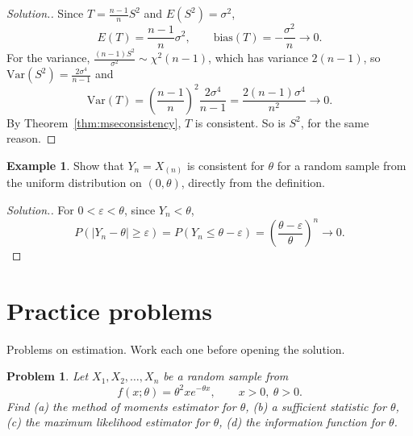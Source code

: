 \documentclass[12pt,a4paper]{report}
\theoremstyle{definition}
\newtheorem{example}[thm]{Example}
\theoremstyle{plain}
\newtheorem{problemx}{Problem}[section]
\newenvironment{problem}{\begin{problemx}}{\end{problemx}}
\newenvironment{solution}
  {\renewcommand{\qedsymbol}{}\begin{proof}[\textit{Solution}.]}
  {\end{proof}}
\begin{document}
\begin{solution}
Since $T = \frac{n-1}{n}S^2$ and $E(S^2) = \sigma^2$,
\[E(T) = \frac{n-1}{n}\sigma^2,\qquad \text{bias}(T) = -\frac{\sigma^2}{n}\to
0 .\]
For the variance, $\frac{(n-1)S^2}{\sigma^2}\sim\chi^2(n - 1)$, which has variance
$2(n - 1)$, so $\text{Var}(S^2) = \frac{2\sigma^4}{n - 1}$ and
\[\text{Var}(T) = \left(\frac{n - 1}{n}\right)^2\frac{2\sigma^4}{n - 1} =
\frac{2(n-1)\sigma^4}{n^2}\to 0 .\]
By Theorem~\ref{thm:mseconsistency}, $T$ is consistent. So is $S^2$, for the same
reason.
\end{solution}

\begin{example}
\label{ex:consistentmax}
Show that $Y_n = X_{(n)}$ is consistent for $\theta$ for a random sample from the
uniform distribution on $(0,\theta)$, directly from the definition.
\end{example}

\begin{solution}
For $0<\varepsilon<\theta$, since $Y_n<\theta$,
\[P(|Y_n - \theta|\geq\varepsilon) = P(Y_n\leq\theta - \varepsilon) = \left(\frac{\theta
- \varepsilon}{\theta}\right)^n\to 0 .\]
\end{solution}


\section{Practice problems}

Problems on estimation. Work each one before opening the solution.

\begin{problem}
Let $X_1,X_2,\ldots,X_n$ be a random sample from
\[f(x;\theta)=\theta^2xe^{-\theta x},\qquad x>0,\ \theta>0.\]
Find (a) the method of moments estimator for $\theta$, (b) a sufficient statistic
for $\theta$, (c) the maximum likelihood estimator for $\theta$, (d) the information
function for $\theta$.
\end{problem}
\end{document}

